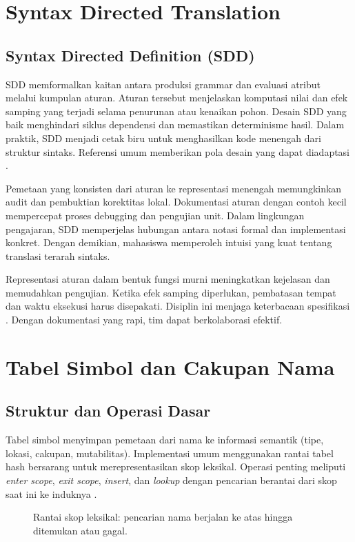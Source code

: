 \documentclass[../main.tex]{subfiles}
\begin{document}
\section{Syntax Directed Translation}
\subsection{Syntax Directed Definition (SDD)}
SDD memformalkan kaitan antara produksi grammar dan evaluasi atribut melalui kumpulan aturan. Aturan tersebut menjelaskan komputasi nilai dan efek samping yang terjadi selama penurunan atau kenaikan pohon. Desain SDD yang baik menghindari siklus dependensi dan memastikan determinisme hasil. Dalam praktik, SDD menjadi cetak biru untuk menghasilkan kode menengah dari struktur sintaks. Referensi umum memberikan pola desain yang dapat diadaptasi \citep{WikiSDT}.

Pemetaan yang konsisten dari aturan ke representasi menengah memungkinkan audit dan pembuktian korektitas lokal. Dokumentasi aturan dengan contoh kecil mempercepat proses debugging dan pengujian unit. Dalam lingkungan pengajaran, SDD memperjelas hubungan antara notasi formal dan implementasi konkret. Dengan demikian, mahasiswa memperoleh intuisi yang kuat tentang translasi terarah sintaks.

Representasi aturan dalam bentuk fungsi murni meningkatkan kejelasan dan memudahkan pengujian. Ketika efek samping diperlukan, pembatasan tempat dan waktu eksekusi harus disepakati. Disiplin ini menjaga keterbacaan spesifikasi \citep{WikiSDT}. Dengan dokumentasi yang rapi, tim dapat berkolaborasi efektif.

\section{Tabel Simbol dan Cakupan Nama}
\subsection{Struktur dan Operasi Dasar}
Tabel simbol menyimpan pemetaan dari nama ke informasi semantik (tipe, lokasi, cakupan, mutabilitas). Implementasi umum menggunakan rantai tabel hash bersarang untuk merepresentasikan skop leksikal. Operasi penting meliputi \emph{enter scope}, \emph{exit scope}, \emph{insert}, dan \emph{lookup} dengan pencarian berantai dari skop saat ini ke induknya \citep{WikiNameBinding,WikiScope}.

\begin{figure}[t]
  \centering
  \caption{Rantai skop leksikal: pencarian nama berjalan ke atas hingga ditemukan atau gagal.}
  \label{fig:scopes}
\end{figure}
\end{document}
